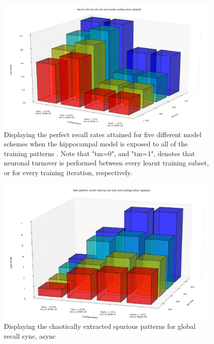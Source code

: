 \begin{figure}
    \centering
    \includegraphics[width=13cm]{fig/i-iters/global-recall}
    \caption{Displaying the perfect recall rates attained for five different model schemes when the hippocampal model is exposed to all of the training patterns . Note that "tm=0", and "tm=1", denotes that neuronal turnover is performed between every learnt training subset, or for every training iteration, respectively.}
    \label{fig:global-recall}
\end{figure}

\begin{figure}
    \centering
    \includegraphics[width=13cm]{fig/i-iters/global-recall-spurious}
    \caption{Displaying the chaotically extracted spurious patterns for global recall sync, async}
    \label{fig:global-recall-spurious}
\end{figure}


